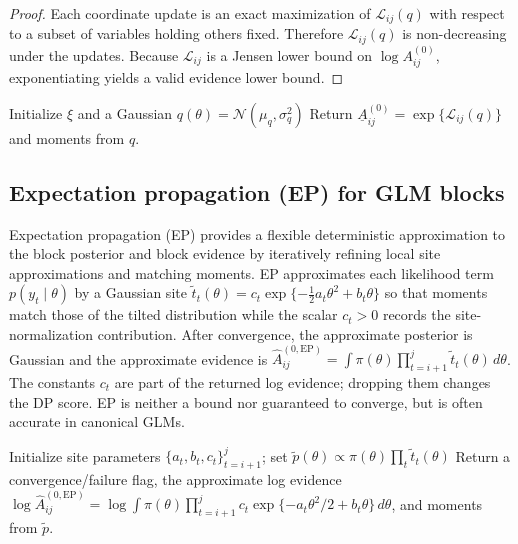 \begin{proof}
Each coordinate update is an exact maximization of $\mathcal{L}_{ij}(q)$ with respect to a
subset of variables holding others fixed. Therefore $\mathcal{L}_{ij}(q)$ is non-decreasing
under the updates. Because $\mathcal{L}_{ij}$ is a Jensen lower bound on $\log A^{(0)}_{ij}$,
exponentiating yields a valid evidence lower bound.
\end{proof}

\begin{algorithm}[H]
\caption{LogisticBlock\_JJ$(y,m,w,i,j,\texttt{prior})$ \quad (variational lower bound)}
\label{alg:jj}
Initialize $\xi$ and a Gaussian $q(\theta)=\mathcal{N}(\mu_q,\sigma_q^2)$\;
Return $\underline{A}^{(0)}_{ij}=\exp\{\mathcal{L}_{ij}(q)\}$ and moments from $q$.
\end{algorithm}

\subsection{Expectation propagation (EP) for GLM blocks}
Expectation propagation (EP) \citep{minka2001ep} provides a flexible deterministic approximation to the block posterior and block evidence by iteratively refining local site approximations and matching moments.
EP approximates each likelihood term $p(y_t\mid\theta)$ by a Gaussian site
$\tilde t_t(\theta)=c_t\exp\{-\tfrac{1}{2}a_t\theta^2+b_t\theta\}$ so that moments match those
of the tilted distribution while the scalar $c_t>0$ records the site-normalization contribution.
After convergence, the approximate posterior is Gaussian and the approximate evidence is
$\widehat A^{(0,\mathrm{EP})}_{ij}=\int \pi(\theta)\prod_{t=i+1}^j \tilde t_t(\theta)\,d\theta$.
The constants $c_t$ are part of the returned log evidence; dropping them changes the DP score.
EP is neither a bound nor guaranteed to converge, but is often accurate in canonical GLMs.

\begin{algorithm}[H]
\caption{GLMBlock\_EP$(y,w,i,j,\texttt{prior})$}
\label{alg:ep}
Initialize site parameters $\{a_t,b_t,c_t\}_{t=i+1}^j$; set $\tilde p(\theta)\propto\pi(\theta)\prod_t \tilde t_t(\theta)$\;
Return a convergence/failure flag, the approximate log evidence
$\log\widehat A^{(0,\mathrm{EP})}_{ij}=\log\int \pi(\theta)\prod_{t=i+1}^j c_t\exp\{-a_t\theta^2/2+b_t\theta\}\,d\theta$, and moments from $\tilde p$.
\end{algorithm}

